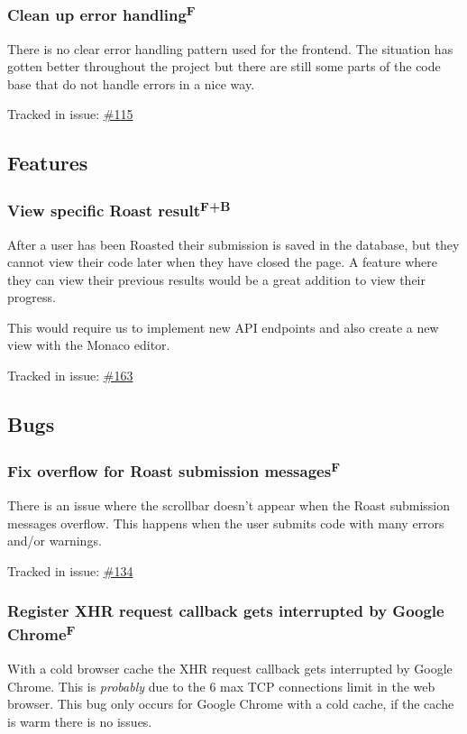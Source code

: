 \documentclass[12pt,a4paper]{report}
\begin{document}
\subsubsection{Clean up error handling\texorpdfstring{\textsuperscript{F}}{}}
There is no clear error handling pattern used for the frontend. The situation has gotten better throughout the project but there are still some parts of the code base that do not handle errors in a nice way.

Tracked in issue: \href{https://github.com/LuleaUniversityOfTechnology/2018-project-roaster/issues/115}{\#115}

\subsection*{Features}
\subsubsection{View specific Roast result\texorpdfstring{\textsuperscript{F+B}}{}}
After a user has been Roasted their submission is saved in the database, but they cannot view their code later when they have closed the page. A feature where they can view their previous results would be a great addition to view their progress.

This would require us to implement new API endpoints and also create a new view with the Monaco editor.

Tracked in issue: \href{https://github.com/LuleaUniversityOfTechnology/2018-project-roaster/issues/163}{\#163}

\subsection*{Bugs}
\subsubsection{Fix overflow for Roast submission messages\texorpdfstring{\textsuperscript{F}}{}}
There is an issue where the scrollbar doesn't appear when the Roast submission messages overflow. This happens when the user submits code with many errors and/or warnings.

Tracked in issue: \href{https://github.com/LuleaUniversityOfTechnology/2018-project-roaster/issues/134}{\#134}

\subsubsection{Register XHR request callback gets interrupted by Google  Chrome\texorpdfstring{\textsuperscript{F}}{}}
With a cold browser cache the XHR request callback gets interrupted by Google Chrome. This is \textit{probably} due to the 6 max TCP connections limit in the web browser. This bug only occurs for Google Chrome with a cold cache, if the cache is warm there is no issues.
\end{document}
